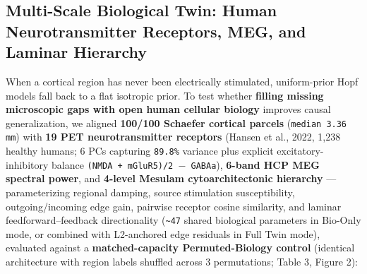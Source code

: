\documentclass[11pt,a4paper]{article}
\begin{document}
\subsection{Multi-Scale Biological Twin: Human Neurotransmitter Receptors, MEG, and Laminar Hierarchy}
When a cortical region has never been electrically stimulated, uniform-prior Hopf models fall back to a flat isotropic prior. To test whether \textbf{filling missing microscopic gaps with open human cellular biology} improves causal generalization, we aligned \textbf{100/100 Schaefer cortical parcels} (\texttt{median 3.36 mm}) with \textbf{19 PET neurotransmitter receptors} (Hansen et al., 2022, 1,238 healthy humans; 6 PCs capturing \texttt{89.8\%} variance plus explicit excitatory-inhibitory balance \texttt{(NMDA + mGluR5)/2 $-$ GABAa}), \textbf{6-band HCP MEG spectral power}, and \textbf{4-level Mesulam cytoarchitectonic hierarchy} --- parameterizing regional damping, source stimulation susceptibility, outgoing/incoming edge gain, pairwise receptor cosine similarity, and laminar feedforward--feedback directionality (\texttt{\textasciitilde{}47} shared biological parameters in Bio-Only mode, or combined with L2-anchored edge residuals in Full Twin mode), evaluated against a \textbf{matched-capacity Permuted-Biology control} (identical architecture with region labels shuffled across 3 permutations; Table 3, Figure 2):
\end{document}
